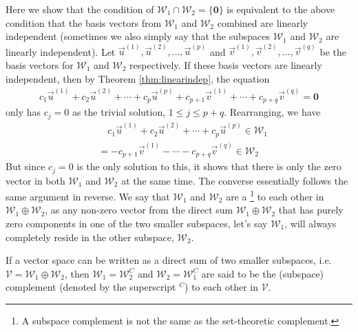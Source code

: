 Here we show that the condition of $\mathcal{W}_1 \cap \mathcal{W}_2 = \{\textbf{0}\}$ is equivalent to the above condition that the basis vectors from $\mathcal{W}_1$ and $\mathcal{W}_2$ combined are linearly independent (sometimes we also simply say that the subspaces $\mathcal{W}_1$ and $\mathcal{W}_2$ are linearly independent). Let $\vec{u}^{(1)}, \vec{u}^{(2)}, \ldots, \vec{u}^{(p)}$ and $\vec{v}^{(1)}, \vec{v}^{(2)}, \ldots, \vec{v}^{(q)}$ be the basis vectors for $\mathcal{W}_1$ and $\mathcal{W}_2$ respectively. If these basis vectors are linearly independent, then by Theorem \ref{thm:linearindep}, the equation
\begin{align*}
c_1\vec{u}^{(1)} + c_2\vec{u}^{(2)} + \cdots + c_p\vec{u}^{(p)} + c_{p+1}\vec{v}^{(1)} + \cdots + c_{p+q}\vec{v}^{(q)} = \textbf{0}
\end{align*}
only has $c_j = 0$ as the trivial solution, $1 \leq j \leq p+q$. Rearranging, we have
\begin{align*}
&\quad c_1\vec{u}^{(1)} + c_2\vec{u}^{(2)} + \cdots + c_p\vec{u}^{(p)} \in \mathcal{W}_1 \\
&= -c_{p+1}\vec{v}^{(1)} - \cdots - c_{p+q}\vec{v}^{(q)} \in \mathcal{W}_2
\end{align*}
But since $c_j = 0$ is the only solution to this, it shows that there is only the zero vector in both $\mathcal{W}_1$ and $\mathcal{W}_2$ at the same time. The converse essentially follows the same argument in reverse. We say that $\mathcal{W}_1$ and $\mathcal{W}_2$ are a \footnote{A subspace complement is not the same as the set-theoretic complement.} to each other in $\mathcal{W}_1 \oplus \mathcal{W}_2$, as any non-zero vector from the direct sum $\mathcal{W}_1 \oplus \mathcal{W}_2$ that has purely zero components in one of the two smaller subspaces, let's say $\mathcal{W}_1$, will always completely reside in the other subspace, $\mathcal{W}_2$.
\begin{proper}
\label{proper:complement}
If a vector space can be written as a direct sum of two smaller subspaces, i.e.\ $\mathcal{V} = \mathcal{W}_1 \oplus \mathcal{W}_2$, then $\mathcal{W}_1 = \mathcal{W}_2^C$ and $\mathcal{W}_2 = \mathcal{W}_1^C$ are said to be the (subspace) complement (denoted by the superscript $^C$) to each other in $\mathcal{V}$.
\end{proper}
